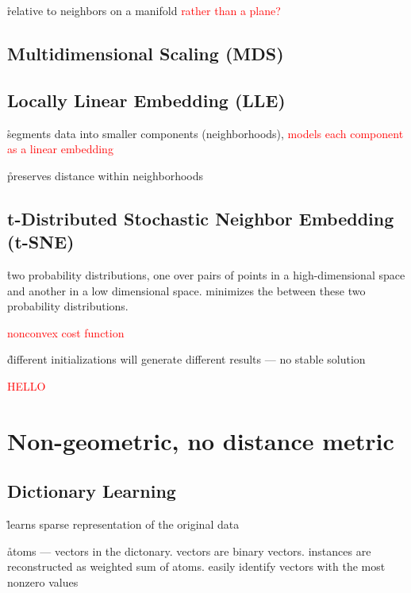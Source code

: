 \r{relative to neighbors on a manifold \textcolor{red}{rather than a plane?}}

\subsection{Multidimensional Scaling (MDS)}


\subsection{Locally Linear Embedding (LLE)}

\r{segments data into smaller components (neighborhoods), \textcolor{red}{models each component as a linear embedding}}

\r{preserves distance within neighborhoods}


\subsection{t-Distributed Stochastic Neighbor Embedding (t-SNE)}




\r{two probability distributions, one over pairs of points in a high-dimensional space and another in a low dimensional space. minimizes the  between these two probability distributions.}


\textcolor{red}{nonconvex cost function}

\r{different initializations will generate different results --- no stable solution}

\textcolor{red}{HELLO}

\section{Non-geometric, no distance metric}

\subsection{Dictionary Learning}


\r{learns sparse representation of the original data}

\r{atoms --- vectors in the dictonary. vectors are binary vectors. instances are reconstructed as weighted sum of atoms. easily identify vectors with the most nonzero values}

